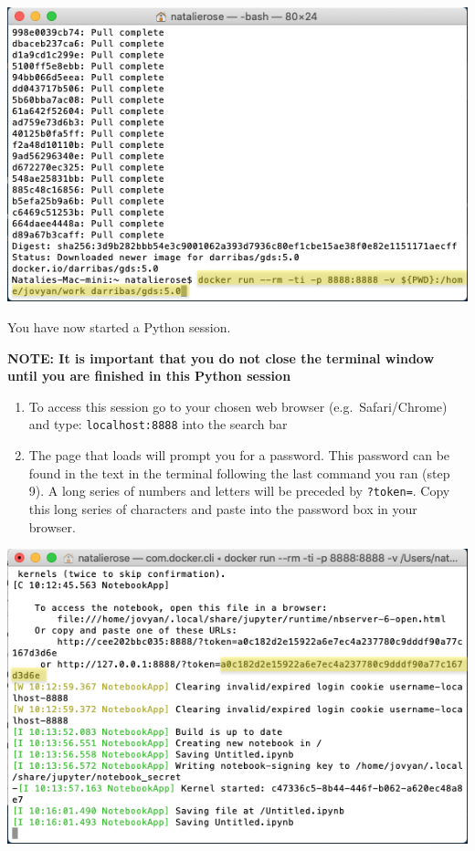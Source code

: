 \documentclass[
]{book}
\begin{document}
\begin{center}\includegraphics[width=7.94in]{figs/chp1/Figure7} \end{center}

You have now started a Python session.

\textbf{NOTE: It is important that you do not close the terminal window until you are finished in this Python session}

\begin{enumerate}
\def\labelenumi{\arabic{enumi}.}
\setcounter{enumi}{1}
\item
  To access this session go to your chosen web browser (e.g.~Safari/Chrome) and type: \texttt{localhost:8888} into the search bar
\item
  The page that loads will prompt you for a password. This password can be found in the text in the terminal following the last command you ran (step 9). A long series of numbers and letters will be preceded by \texttt{?token=}. Copy this long series of characters and paste into the password box in your browser.
\end{enumerate}

\begin{center}\includegraphics[width=7.94in]{figs/chp1/Figure9} \end{center}
\end{document}

